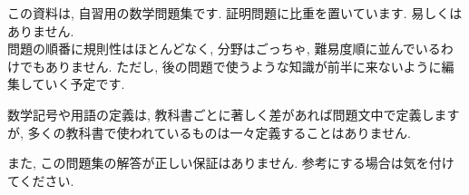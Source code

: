 \documentclass[dvipdfmx,a4j]{jarticle}
\begin{document}
この資料は, 自習用の数学問題集です. 証明問題に比重を置いています. 易しくはありません.\\
問題の順番に規則性はほとんどなく, 分野はごっちゃ, 難易度順に並んでいるわけでもありません. ただし, 後の問題で使うような知識が前半に来ないように編集していく予定です.

数学記号や用語の定義は, 教科書ごとに著しく差があれば問題文中で定義しますが, 多くの教科書で使われているものは一々定義することはありません.

また, この問題集の解答が正しい保証はありません. 参考にする場合は気を付けてください.
\end{document}
